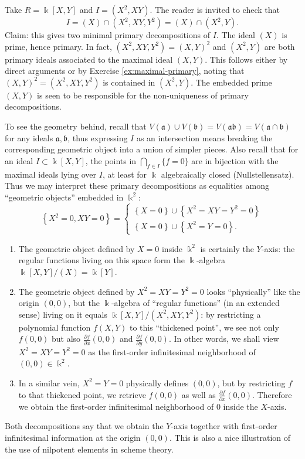\begin{example}
	Take $R=\Bbbk[X,Y]$ and $I = (X^2, XY)$. The reader is invited to check that
	\[ I = (X) \cap (X^2, XY, Y^2) = (X) \cap (X^2, Y). \]
	Claim: this gives two minimal primary decompositions of $I$. The ideal $(X)$ is prime, hence primary. In fact, $(X^2, XY, Y^2) = (X,Y)^2$ and $(X^2, Y)$ are both primary ideals associated to the maximal ideal $(X, Y)$. This follows either by direct arguments or by Exercise \ref{ex:maximal-primary}, noting that $(X,Y)^2 = (X^2, XY, Y^2)$ is contained in $(X^2, Y)$. The embedded prime $(X,Y)$ is seen to be responsible for the non-uniqueness of primary decompositions.
	
	To see the geometry behind, recall that $V(\mathfrak{a}) \cup V(\mathfrak{b}) = V(\mathfrak{a}\mathfrak{b}) = V(\mathfrak{a} \cap \mathfrak{b})$ for any ideals $\mathfrak{a}, \mathfrak{b}$, thus expressing $I$ as an intersection means breaking the corresponding geometric object into a union of simpler pieces. Also recall that for an ideal $I \subset \Bbbk[X,Y]$, the points in $\bigcap_{f \in I} \{f=0\}$ are in bijection with the maximal ideals lying over $I$, at least for $\Bbbk$ algebraically closed (Nullstellensatz). Thus we may interpret these primary decompositions as equalities among ``geometric objects'' embedded in $\Bbbk^2$:
	\[ \left\{ X^2=0, XY=0 \right\} = \begin{cases} \left\{ X = 0 \right\} \cup \left\{X^2=XY=Y^2=0 \right\} \\ \left\{ X = 0 \right\} \cup \left\{ X^2=Y=0 \right\}. \end{cases} \]
	\begin{enumerate}
		\item The geometric object defined by $X=0$ inside $\Bbbk^2$ is certainly the $Y$-axis: the regular functions living on this space form the $\Bbbk$-algebra $\Bbbk[X,Y]/(X) = \Bbbk[Y]$.
		\item The geometric object defined by $X^2=XY=Y^2=0$ looks ``physically'' like the origin $(0,0)$, but the $\Bbbk$-algebra of ``regular functions'' (in an extended sense) living on it equals $\Bbbk[X,Y]/(X^2,XY,Y^2)$: by restricting a polynomial function $f(X,Y)$ to this ``thickened point'', we see not only $f(0,0)$ but also $\frac{\partial f}{\partial x}(0,0)$ and $\frac{\partial f}{\partial y}(0,0)$. In other words, we shall view $X^2=XY=Y^2=0$ as the first-order infinitesimal neighborhood of $(0,0) \in \Bbbk^2$.
		\item In a similar vein, $X^2=Y=0$ physically defines $(0,0)$, but by restricting $f$ to that thickened point, we retrieve $f(0,0)$ as well as $\frac{\partial f}{\partial x}(0,0)$. Therefore we obtain the first-order infinitesimal neighborhood of $0$ inside the $X$-axis.
	\end{enumerate}

	Both decompositions say that we obtain the $Y$-axis together with first-order infinitesimal information at the origin $(0,0)$. This is also a nice illustration of the use of nilpotent elements in scheme theory.
\end{example}

